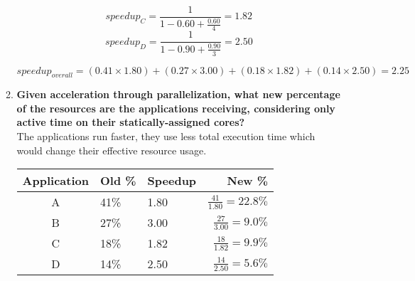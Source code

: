 \begin{enumerate}
\begin{enumerate}
                    \hfill
                    \begin{minipage}{0.6\textwidth}
                        \begin{equation*}
                            speedup_{C} = \frac{1}{1-0.60 + \frac{0.60}{4}} = 1.82
                        \end{equation*}
                        \begin{equation*}
                            speedup_{D} = \frac{1}{1-0.90 + \frac{0.90}{3}} = 2.50
                        \end{equation*}
                    \end{minipage}
                    \begin{equation*}
                        speedup_{overall} = (0.41 \times 1.80) + (0.27 \times 3.00) + (0.18 \times 1.82) + (0.14 \times 2.50) = 2.25
                    \end{equation*}
              \item \textbf{Given acceleration through parallelization, what new percentage of the resources are the applications receiving, considering only active time on their statically-assigned cores?} \\
                    The applications run faster, they use less total execution time which would change their effective resource usage.
                    \begin{table}[H]
                        \centering
                        \begin{tabular}{@{}cllr@{}}
                            \toprule
                            Application & Old \% & Speedup & New \%                     \\
                            \midrule
                            A           & 41\%   & 1.80    & $\frac{41}{1.80} = 22.8\%$ \\
                            B           & 27\%   & 3.00    & $\frac{27}{3.00} = 9.0\%$  \\
                            C           & 18\%   & 1.82    & $\frac{18}{1.82} = 9.9\%$  \\
                            D           & 14\%   & 2.50    & $\frac{14}{2.50} = 5.6\%$  \\
                            \bottomrule
                        \end{tabular}
                    \end{table}


\end{enumerate}
\end{enumerate}

